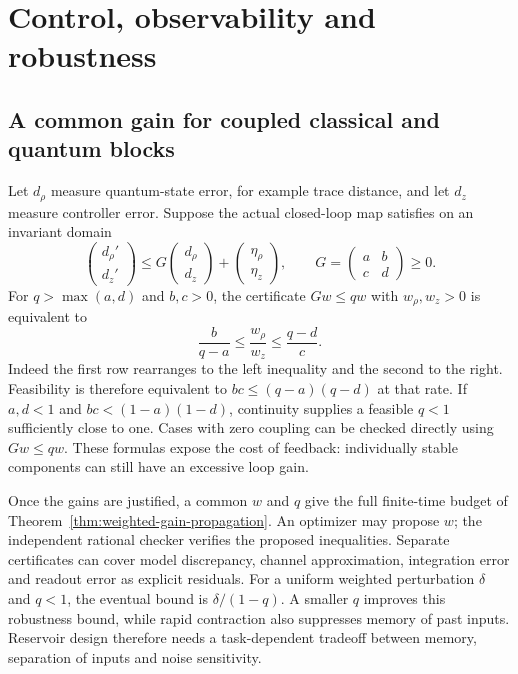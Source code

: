 \section{Control, observability and robustness}

\subsection{A common gain for coupled classical and quantum blocks}

Let $d_\rho$ measure quantum-state error, for example trace distance, and
let $d_z$ measure controller error. Suppose the actual closed-loop map
satisfies on an invariant domain
\[
 \begin{pmatrix}d_\rho'\\d_z'\end{pmatrix}
 \le
 G\begin{pmatrix}d_\rho\\d_z\end{pmatrix}
 +\begin{pmatrix}\eta_\rho\\\eta_z\end{pmatrix},\qquad
 G=\begin{pmatrix}a&b\\c&d\end{pmatrix}\ge0.
\]
For $q>\max(a,d)$ and $b,c>0$, the certificate
$Gw\le qw$ with $w_\rho,w_z>0$ is equivalent to
\[
 \frac{b}{q-a}\le\frac{w_\rho}{w_z}
 \le\frac{q-d}{c}.
\]
Indeed the first row rearranges to the left inequality and the second to
the right. Feasibility is therefore equivalent to
$bc\le(q-a)(q-d)$ at that rate. If $a,d<1$ and
$bc<(1-a)(1-d)$, continuity supplies a feasible $q<1$ sufficiently close
to one. Cases with zero coupling can be checked directly using $Gw\le qw$.
These formulas expose the cost of feedback: individually stable components
can still have an excessive loop gain.

Once the gains are justified, a common $w$ and $q$ give the full finite-time
budget of Theorem~\ref{thm:weighted-gain-propagation}. An optimizer may
propose $w$; the independent rational checker verifies the proposed
inequalities. Separate certificates can cover model discrepancy, channel
approximation, integration error and readout error as explicit residuals.
For a uniform weighted perturbation $\delta$ and $q<1$, the eventual
bound is $\delta/(1-q)$. A smaller $q$ improves this robustness bound,
while rapid contraction also suppresses memory of past inputs. Reservoir
design therefore needs a task-dependent tradeoff between memory, separation
of inputs and noise sensitivity.\cite{qtsFujiiNakajima2017}

